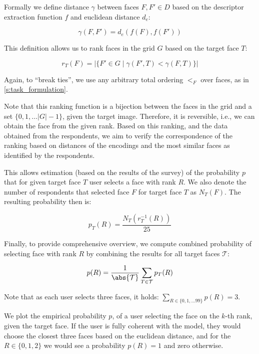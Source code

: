 Formally we define distance $\gamma$ between faces $F, F' \in D$ based on the descriptor extraction function $f$ and euclidean distance $d_e$:

$$
\gamma(F, F') = d_e(f(F), f(F'))
$$

This definition allows us to rank faces in the grid $G$ based on the target face $T$:

$$
    r_T(F) = |\{F'\in G\mid\gamma(F', T) < \gamma(F, T)\}|
$$

Again, to ``break ties'', we use any arbitrary total ordering $<_F$ over faces, as in \autoref{s:task_formulation}.



Note that this ranking function is a bijection between the faces in the grid and a set $\{0, 1, \ldots |G| - 1\}$, given the target image. Therefore, it is reversible, i.e., we can obtain the face from the given rank. Based on this ranking, and the data obtained from the respondents, we aim to verify the correspondence of the ranking based on distances of the encodings and the most similar faces as identified by the respondents.

This allows estimation (based on the results of the survey)  of the probability $p$ that for given target face $T$ user selects a face with rank $R$. We also denote the number of respondents that selected face $F$ for target face $T$ as $N_T(F)$. The resulting probability then is:

$$
    p_T(R) = \frac{N_T(r_T^{-1}(R))}{25}
$$

Finally, to provide comprehensive overview, we compute combined probability of selecting face with rank $R$ by combining the results for all target faces $\mathcal{T}$:

$$
p(R) = \frac{1}{\abs{\mathcal{T}}}\sum_{T\in \mathcal{T}} p_T(R)
$$

Note that as each user selects three faces, it holds: $\sum_{R\in\{0,1,\ldots99\}} p(R) = 3$.

We plot the empirical probability $p$, of a user selecting the face on the $k$-th rank, given the target face. If the user is fully coherent with the model, they would choose the closest three faces based on the euclidean distance, and for the $R \in \{0,1,2\}$ we would see a probability $p(R) = 1$ and zero otherwise. 

